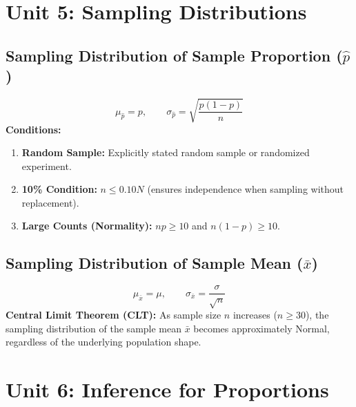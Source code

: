 ﻿\documentclass[11pt,oneside,openany]{book}
\begin{document}
\chapter{Unit 5: Sampling Distributions}

\section{Sampling Distribution of Sample Proportion ($\hat{p}$)}
\begin{equation}
  \mu_{\hat{p}} = p, \qquad \sigma_{\hat{p}} = \sqrt{\frac{p(1-p)}{n}}
\end{equation}
\textbf{Conditions:}
\begin{enumerate}[leftmargin=1.2em]
  \item \textbf{Random Sample:} Explicitly stated random sample or randomized experiment.
  \item \textbf{10\% Condition:} $n \le 0.10N$ (ensures independence when sampling without replacement).
  \item \textbf{Large Counts (Normality):} $np \ge 10$ and $n(1-p) \ge 10$.
\end{enumerate}

\section{Sampling Distribution of Sample Mean ($\bar{x}$)}
\begin{equation}
  \mu_{\bar{x}} = \mu, \qquad \sigma_{\bar{x}} = \frac{\sigma}{\sqrt{n}}
\end{equation}
\textbf{Central Limit Theorem (CLT):} As sample size $n$ increases ($n \ge 30$), the sampling distribution of the sample mean $\bar{x}$ becomes approximately Normal, regardless of the underlying population shape.

\chapter{Unit 6: Inference for Proportions}
\end{document}
